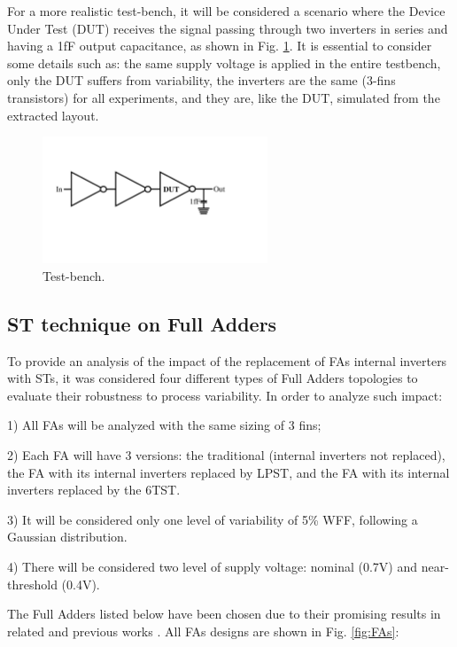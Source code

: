 \documentclass[pgmicro,diss,english]{iiufrgs}
\begin{document}
 For a more realistic test-bench, it will be considered a scenario where the Device Under Test (DUT) receives the signal passing through two inverters in series and having a 1fF output capacitance, as shown in Fig. \ref{fig:tbST}. It is essential to consider some details such as: the same supply voltage is applied in the entire testbench, only the DUT suffers from variability, the inverters are the same (3-fins transistors) for all experiments, and they are, like the DUT, simulated from the extracted layout.

\begin{figure}[]
\centering
\includegraphics[width=0.6\textwidth, trim={2cm 7cm 6cm 5cm},clip]{testbench.pdf}
\caption{Test-bench.}
\label{fig:tbST}
\end{figure}

\subsection{ST technique on Full Adders}

To provide an analysis of the impact of the replacement of FAs internal inverters with STs, it was considered four different types of Full Adders topologies to evaluate their robustness to process variability. In order to analyze such impact:

1) All FAs will be analyzed with the same sizing of 3 fins;

2) Each FA will have 3 versions: the traditional (internal inverters not replaced), the FA with its internal inverters replaced by LPST, and the FA with its internal inverters replaced by the 6TST.

3) It will be considered only one level of variability of 5\% WFF, following a Gaussian distribution.

4) There will be considered two level of supply voltage: nominal (0.7V) and near-threshold (0.4V).

The Full Adders listed below have been chosen due to their promising results in related and previous works \cite{ames2016investigating,dokania2015circuit,dokania2013investigation,moraes2018evaluation}. All FAs designs are shown in Fig. \ref{fig:FAs}:
\end{document}
